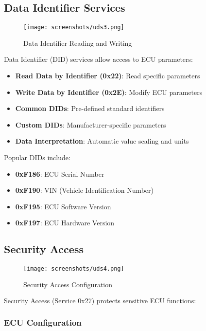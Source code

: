 \documentclass[11pt,a4paper]{article}
\begin{document}
\subsection{Data Identifier Services}

\begin{figure}[H]
    \centering
    \texttt{[image: screenshots/uds3.png]}
    \caption{Data Identifier Reading and Writing}
    \label{fig:uds3}
\end{figure}

Data Identifier (DID) services allow access to ECU parameters:

\begin{itemize}
    \item \textbf{Read Data by Identifier (0x22)}: Read specific parameters
    \item \textbf{Write Data by Identifier (0x2E)}: Modify ECU parameters
    \item \textbf{Common DIDs}: Pre-defined standard identifiers
    \item \textbf{Custom DIDs}: Manufacturer-specific parameters
    \item \textbf{Data Interpretation}: Automatic value scaling and units
\end{itemize}

Popular DIDs include:
\begin{itemize}
    \item \textbf{0xF186}: ECU Serial Number
    \item \textbf{0xF190}: VIN (Vehicle Identification Number)
    \item \textbf{0xF195}: ECU Software Version
    \item \textbf{0xF197}: ECU Hardware Version
\end{itemize}

\subsection{Security Access}

\begin{figure}[H]
    \centering
    \texttt{[image: screenshots/uds4.png]}
    \caption{Security Access Configuration}
    \label{fig:uds4}
\end{figure}

Security Access (Service 0x27) protects sensitive ECU functions:

\subsubsection{ECU Configuration}
\end{document}
